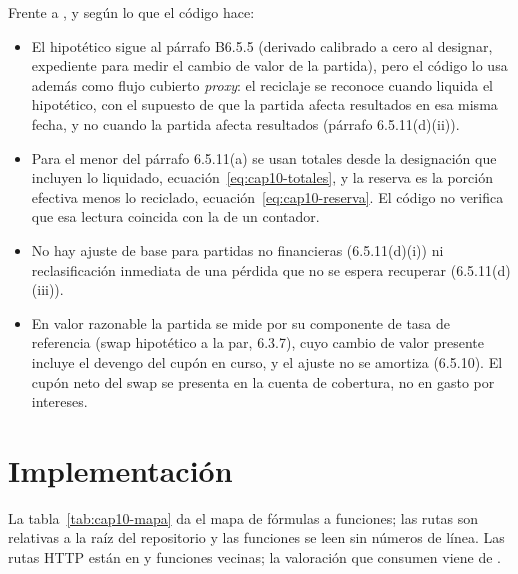 \begin{diferencia}
  Frente a \citet{iasb2014}, y según lo que el código hace:
  \begin{itemize}
    \item El hipotético sigue al párrafo B6.5.5 (derivado calibrado a cero al designar, expediente para medir el cambio
      de valor de la partida), pero el código lo usa además como flujo cubierto \emph{proxy}: el reciclaje se reconoce
      cuando liquida el hipotético, con el supuesto de que la partida afecta resultados en esa misma fecha, y no cuando la
      partida afecta resultados (párrafo 6.5.11(d)(ii)).
    \item Para el menor del párrafo 6.5.11(a) se usan totales desde la designación que incluyen lo liquidado,
      ecuación~\eqref{eq:cap10-totales}, y la reserva es la porción efectiva menos lo reciclado, ecuación~\eqref{eq:cap10-reserva}.
      El código no verifica que esa lectura coincida con la de un contador.
    \item No hay ajuste de base para partidas no financieras (6.5.11(d)(i)) ni reclasificación inmediata de una pérdida
      que no se espera recuperar (6.5.11(d)(iii)).
    \item En valor razonable la partida se mide por su componente de tasa de referencia (swap hipotético a la par, 6.3.7),
      cuyo cambio de valor presente incluye el devengo del cupón en curso, y el ajuste no se amortiza (6.5.10). El cupón
      neto del swap se presenta en la cuenta de cobertura, no en gasto por intereses.
  \end{itemize}
\end{diferencia}

\section{Implementación}\label{sec:cap10-implementacion}

La tabla~\ref{tab:cap10-mapa} da el mapa de fórmulas a funciones; las rutas son relativas a la raíz del repositorio y
las funciones se leen sin números de línea. Las rutas HTTP están en  y
funciones vecinas; la valoración que consumen viene de .

